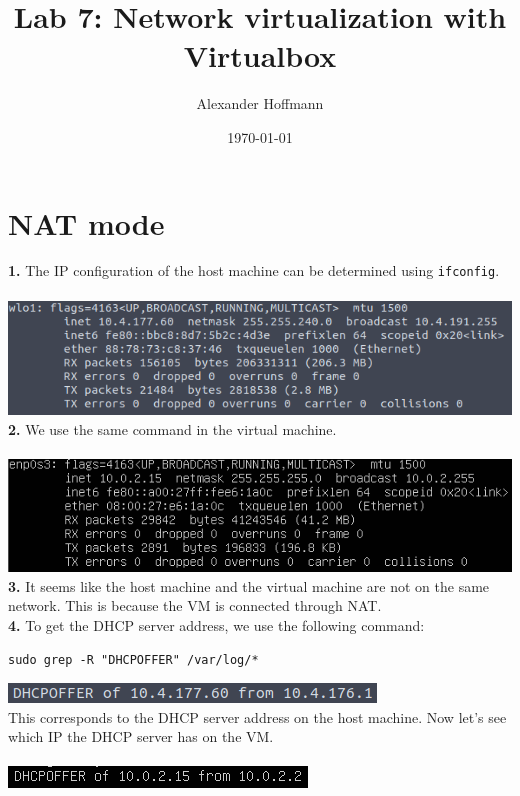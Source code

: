 \documentclass[12pt]{extarticle}
\title{Lab 7: Network virtualization with Virtualbox}
\author{Alexander Hoffmann}
\date{\today}
\begin{document}
\maketitle

\section{NAT mode}
\textbf{1.} The IP configuration of the host machine can be determined using \texttt{ifconfig}.\\~\\
\includegraphics[scale=0.6]{resources/1-1.png}\\

\textbf{2.} We use the same command in the virtual machine.\\~\\
\includegraphics[scale=0.7]{resources/1-2.png}\\

\textbf{3.} It seems like the host machine and the virtual machine are not on the same network. This is because the VM is connected through NAT.\\

\textbf{4.} To get the DHCP server address, we use the following command:
\begin{verbatim}
sudo grep -R "DHCPOFFER" /var/log/*
\end{verbatim}
\includegraphics[scale=0.7]{resources/1-4.png}\\
This corresponds to the DHCP server address on the host machine. Now let's see which IP the DHCP server has on the VM.\\~\\
\includegraphics[scale=0.8]{resources/1-4-2.png}\\
\end{document}
